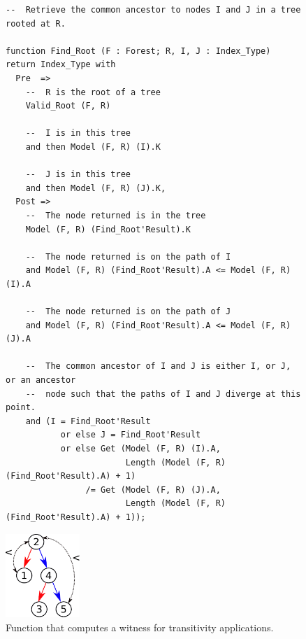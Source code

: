 \documentclass{llncs}
\begin{document}
\begin{figure}
\begin{minipage}[c]{\linewidth}
\begin{small}
\begin{lstlisting}
--  Retrieve the common ancestor to nodes I and J in a tree rooted at R.

function Find_Root (F : Forest; R, I, J : Index_Type) return Index_Type with
  Pre  =>
    --  R is the root of a tree
    Valid_Root (F, R)

    --  I is in this tree
    and then Model (F, R) (I).K

    --  J is in this tree
    and then Model (F, R) (J).K,
  Post =>
    --  The node returned is in the tree
    Model (F, R) (Find_Root'Result).K

    --  The node returned is on the path of I
    and Model (F, R) (Find_Root'Result).A <= Model (F, R) (I).A

    --  The node returned is on the path of J
    and Model (F, R) (Find_Root'Result).A <= Model (F, R) (J).A

    --  The common ancestor of I and J is either I, or J, or an ancestor
    --  node such that the paths of I and J diverge at this point.
    and (I = Find_Root'Result
           or else J = Find_Root'Result
           or else Get (Model (F, R) (I).A,
                        Length (Model (F, R) (Find_Root'Result).A) + 1)
                /= Get (Model (F, R) (J).A,
                        Length (Model (F, R) (Find_Root'Result).A) + 1));
\end{lstlisting}
\end{small}
\end{minipage}\hspace*{-30mm}
\begin{minipage}[c]{.22\linewidth}
\begin{center}
\vspace*{-35mm}
\includegraphics[width=28mm]{transitivity.pdf}
\end{center}
\end{minipage}
\caption{\label{fig-proof-wit} Function that computes a witness for transitivity applications.}
\end{figure}
\end{document}
